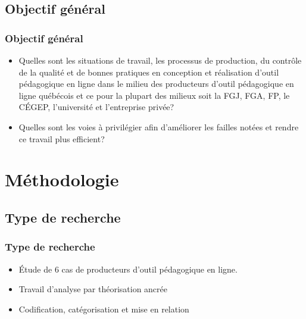                 \subsection{Objectif général} 
		\begin{frame}
			\frametitle{Objectif général}
                        
                        \begin{itemize} 
                        \item  Quelles sont les situations de travail, les processus de production, du contrôle de la qualité et de bonnes pratiques en conception et réalisation d’outil pédagogique en ligne dans le milieu des producteurs d’outil pédagogique en ligne québécois et ce pour la plupart des milieux soit la FGJ, FGA, FP, le CÉGEP, l’université et l’entreprise privée? 
                         \item Quelles sont les voies à privilégier afin d’améliorer les failles notées et rendre ce travail plus efficient?

                        \end{itemize}

             
                \end{frame}
                
	\section{Méthodologie} 
		
                        
				\subsection{Type de recherche} 
					\begin{frame}
						\frametitle{Type de recherche}
                        
                        			\begin{itemize} 
                       				 \item Étude de 6 cas de producteurs d’outil pédagogique en ligne. 
                       				 \item Travail d’analyse par théorisation ancrée 
                       				 \item Codification, catégorisation et mise en relation 

                       		 \end{itemize}
				\end{frame}
